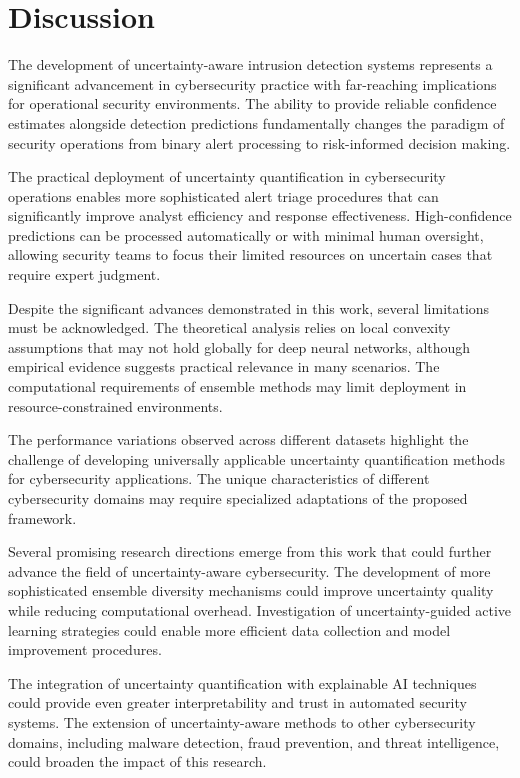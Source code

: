\documentclass[journal]{IEEEtran}
\begin{document}
\section{Discussion}

The development of uncertainty-aware intrusion detection systems represents a significant advancement in cybersecurity practice with far-reaching implications for operational security environments. The ability to provide reliable confidence estimates alongside detection predictions fundamentally changes the paradigm of security operations from binary alert processing to risk-informed decision making.

The practical deployment of uncertainty quantification in cybersecurity operations enables more sophisticated alert triage procedures that can significantly improve analyst efficiency and response effectiveness. High-confidence predictions can be processed automatically or with minimal human oversight, allowing security teams to focus their limited resources on uncertain cases that require expert judgment.

Despite the significant advances demonstrated in this work, several limitations must be acknowledged. The theoretical analysis relies on local convexity assumptions that may not hold globally for deep neural networks, although empirical evidence suggests practical relevance in many scenarios. The computational requirements of ensemble methods may limit deployment in resource-constrained environments.

The performance variations observed across different datasets highlight the challenge of developing universally applicable uncertainty quantification methods for cybersecurity applications. The unique characteristics of different cybersecurity domains may require specialized adaptations of the proposed framework.

Several promising research directions emerge from this work that could further advance the field of uncertainty-aware cybersecurity. The development of more sophisticated ensemble diversity mechanisms could improve uncertainty quality while reducing computational overhead. Investigation of uncertainty-guided active learning strategies could enable more efficient data collection and model improvement procedures.

The integration of uncertainty quantification with explainable AI techniques could provide even greater interpretability and trust in automated security systems. The extension of uncertainty-aware methods to other cybersecurity domains, including malware detection, fraud prevention, and threat intelligence, could broaden the impact of this research.
\end{document}
